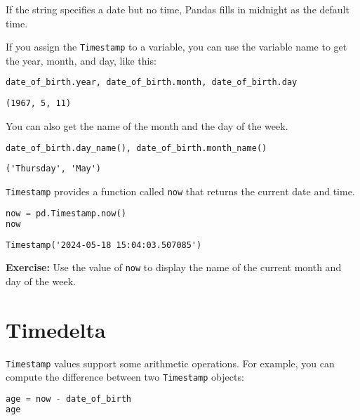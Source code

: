 If the string specifies a date but no time, Pandas fills in midnight as
the default time.

\pagebreak

If you assign the \passthrough{\lstinline!Timestamp!} to a variable, you
can use the variable name to get the year, month, and day, like this:

\begin{lstlisting}[language=Python,style=source]
date_of_birth.year, date_of_birth.month, date_of_birth.day
\end{lstlisting}

\begin{lstlisting}[style=output]
(1967, 5, 11)
\end{lstlisting}

You can also get the name of the month and the day of the week.

\begin{lstlisting}[language=Python,style=source]
date_of_birth.day_name(), date_of_birth.month_name()
\end{lstlisting}

\begin{lstlisting}[style=output]
('Thursday', 'May')
\end{lstlisting}

\passthrough{\lstinline!Timestamp!} provides a function called
\passthrough{\lstinline!now!} that returns the current date and time.

\begin{lstlisting}[language=Python,style=source]
now = pd.Timestamp.now()
now
\end{lstlisting}

\begin{lstlisting}[style=output]
Timestamp('2024-05-18 15:04:03.507085')
\end{lstlisting}

\textbf{Exercise:} Use the value of \passthrough{\lstinline!now!} to
display the name of the current month and day of the week.

\section{Timedelta}\label{timedelta}

\passthrough{\lstinline!Timestamp!} values support some arithmetic
operations. For example, you can compute the difference between two
\passthrough{\lstinline!Timestamp!} objects:

\begin{lstlisting}[language=Python,style=source]
age = now - date_of_birth
age
\end{lstlisting}

